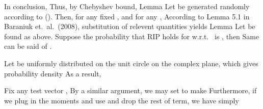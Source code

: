 In conclusion,
Thus, by Chebyshev bound,
\Result
{Lemma}
{
Let  be generated randomly according to ().
Then, for any fixed , and for any ,
}
According to Lemma 5.1 in Baraniuk et.\ al.\ (2008), substitution of relevent quantities yields
\Result
{Lemma}
{
Let  be found as above.
Suppose the probability that RIP holds for  w.r.t.\  is , then
Same can be said of .
}

\stopsection

\startsection [title={Concentration Inequality of Precoders and Combiners}]

Let  be uniformly distributed on the unit circle on the complex plane, which gives probability density
As a result,

Fix any test vector , 
By a similar argument, we may set
to make
Furthermore, if we plug in the moments and use  and drop the rest of  term, we have simply

